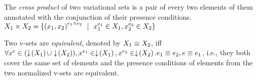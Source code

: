 \begin{definition} 
\label{def:vset-cross}
The \emph{cross product} of two variational sets is a pair of every two elements of 
them annotated with the conjunction of their presence conditions.
\ensuremath{
\vset_1 \times \vset_2 = \setDef{
\annot [\dimMeta_1 \wedge \dimMeta_2] {(\elem_1, \elem_2)} \myOR
\annot [\dimMeta_1] \elem_1 \in \vset_1, \annot [\dimMeta_2] \elem_2 \in \vset_2
}
}
%
\end{definition}

\begin{definition} 
\label{def:vset-eq}
Two v-sets are \emph{equivalent}, denoted by
\ensuremath{\vset_1 \equiv \vset_2}, iff
\ensuremath{\forall \annot  \elem \in (\filterSet {\vset_1} \cup \filterSet {\vset_2}),
\annot [\dimMeta_1] \elem \in \filterSet {\vset_1}, \annot [\dimMeta_2] \elem \in \filterSet {\vset_2}.
\dimMeta_1 \equiv \dimMeta_2, \dimMeta \equiv \dimMeta_1},
i.e., they both cover the same set of elements and the presence conditions
of elements from the two normalized v-sets are equivalent.
\end{definition}

%

